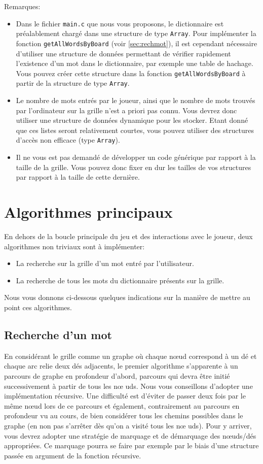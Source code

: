 \documentclass[a4paper,10pt]{article}
\begin{document}
Remarques:
\begin{itemize}
\item Dans le fichier \texttt{main.c} que nous vous proposons, le
  dictionnaire est préalablement chargé dans une structure de type
  \texttt{Array}. Pour implémenter la fonction
  \texttt{getAllWordsByBoard} (voir \ref{sec:rechmot}), il est
  cependant nécessaire d'utiliser une structure de données permettant
  de vérifier rapidement l'existence d'un mot dans le dictionnaire,
  par exemple une table de hachage. Vous pouvez créer cette structure
  dans la fonction \texttt{getAllWordsByBoard} à partir de la
  structure de type \texttt{Array}.
\item Le nombre de mots entrés par le joueur, ainsi que le nombre de
  mots trouvés par l'ordinateur sur la grille n'est a priori pas
  connu. Vous devrez donc utiliser une structure de données dynamique
  pour les stocker. Etant donné que ces listes seront relativement
  courtes, vous pouvez utiliser des structures d'accès non efficace
  (type \texttt{Array}).
\item Il ne vous est pas demandé de développer un code générique par
  rapport à la taille de la grille. Vous pouvez donc fixer en dur les
  tailles de vos structures par rapport à la taille de cette dernière.
\end{itemize}

\section{Algorithmes principaux}

En dehors de la boucle principale du jeu et des interactions avec
le joueur, deux algorithmes non triviaux sont à implémenter:
\begin{itemize}
\item La recherche sur la grille d'un mot entré par l'utilisateur.
\item La recherche de tous les mots du dictionnaire présents sur la
  grille.
\end{itemize}

Nous vous donnons ci-dessous quelques indications sur la manière de
mettre au point ces algorithmes.

\subsection{Recherche d'un mot}

En considérant le grille comme un graphe où chaque n\oe ud correspond
à un dé et chaque arc relie deux dés adjacents, le premier algorithme
s'apparente à un parcours de graphe en profondeur d'abord, parcours
qui devra être initié successivement à partir de tous les n\oe
uds. Nous vous conseillons d'adopter une implémentation récursive. Une
difficulté est d'éviter de passer deux fois par le même n\oe ud lors
de ce parcours et également, contrairement au parcours en profondeur
vu au cours, de bien considérer tous les chemins possibles dans le
graphe (en non pas s'arrêter dès qu'on a visité tous les n\oe
uds). Pour y arriver, vous devrez adopter une stratégie de marquage et
de démarquage des n\oe uds/dés appropriées. Ce marquage pourra se
faire par exemple par le biais d'une structure passée en argument de
la fonction récursive.
\end{document}
